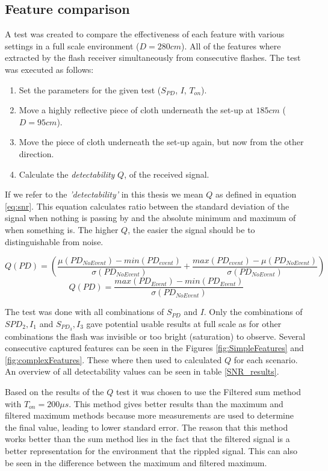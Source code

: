 \subsection{Feature comparison}
A test was created to compare the effectiveness of each feature with various settings in a full scale environment ($D = 280cm$). All of the features where extracted by the flash receiver simultaneously from consecutive flashes. The test was executed as follows:
\begin{enumerate}[itemsep=-1ex]
	\item Set the parameters for the given test ($S_{PD}$, $I$, $T_{on}$).
	\item Move a highly reflective piece of cloth underneath the set-up at $185cm$ ($D = 95cm$).
	\item Move the piece of cloth underneath the set-up again, but now from the other direction.
	\item Calculate the \textit{detectability} $Q$, of the received signal.
\end{enumerate}
If we refer to the \textit{'detectability'} in this thesis we mean $Q$ as defined in equation \ref{eq:snr}. This equation calculates ratio between the standard deviation of the signal when nothing is passing by and the absolute minimum and maximum of when something is. The higher $Q$, the easier the signal should be to distinguishable from noise.

\begin{equation}
Q(PD) = \left(\frac{\mu(PD_{NoEvent}) - min(PD_{event})}{\sigma(PD_{NoEvent})} + \frac{ max(PD_{event}) - \mu(PD_{NoEvent})}{\sigma(PD_{NoEvent})}\right)
\end{equation}
\begin{equation}
\label{eq:snr}
Q(PD) = \frac{max(PD_{Event}) - min(PD_{Event})}{\sigma(PD_{NoEvent})} 
\end{equation}

The test was done with all combinations of $S_{PD}$ and $I$. Only the combinations of $S{PD_2}, I_{1}$ and $S_{PD_3}, I_{3}$ gave potential usable results at full scale as for other combinations the flash was invisible or too bright (saturation) to observe. Several consecutive captured features can be seen in the Figures \ref{fig:SimpleFeatures} and \ref{fig:complexFeatures}. These where then used to calculated $Q$ for each scenario. An overview of all detectability values can be seen in table \ref{SNR_results}.

Based on the results of the $Q$ test it was chosen to use the Filtered sum method with $T_{on} = 200\mu s$. This method gives better results than the maximum and filtered maximum methods because more measurements are used to determine the final value, leading to lower standard error. The reason that this method works better than the sum method lies in the fact that the filtered signal is a better representation for the environment that the rippled signal. This can also be seen in the difference between the maximum and filtered maximum.

